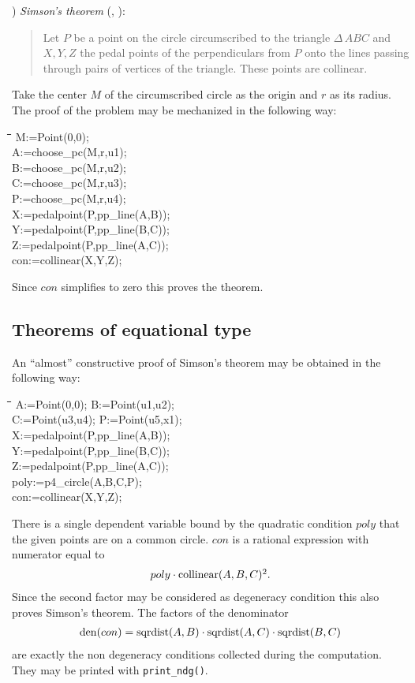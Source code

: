 \documentclass{article}
\newenvironment{code}{\tt \begin{tabbing}
\hspace*{1cm}\=\hspace*{1cm}\=\hspace*{1cm}\=
\hspace*{1cm}\=\hspace*{1cm}\=\kill
}{\end{tabbing}}
\newcommand{\formel}[1]{\[\begin{array}{l} #1\end{array}\]}
\begin{document}
) {\em Simson's theorem} (\cite[p. 261]{Chou:84},
\cite[thm. 2.51]{Coxeter:67}):
\begin{quote}
Let $P$ be a point on the circle circumscribed to the triangle
$\Delta\,ABC$ and $X,Y,Z$ the pedal points of the perpendiculars from
$P$ onto the lines passing through pairs of vertices of the triangle.
These points are collinear.
\end{quote}

Take the center $M$ of the circumscribed circle as the origin and $r$
as its radius. The proof of the problem may be mechanized in the
following way:
\begin{code}\>\+
        M:=Point(0,0);\\
        A:=choose\_pc(M,r,u1);\\
        B:=choose\_pc(M,r,u2);\\
        C:=choose\_pc(M,r,u3);\\
        P:=choose\_pc(M,r,u4);\\
        X:=pedalpoint(P,pp\_line(A,B));\\
        Y:=pedalpoint(P,pp\_line(B,C));\\
        Z:=pedalpoint(P,pp\_line(A,C));\\[8pt]
 
        con:=collinear(X,Y,Z);
\end{code}
Since $con$ simplifies to zero this proves the theorem.

 
\subsection{Theorems of equational type}

An ``almost'' constructive proof of Simson's theorem may be obtained
in the following way:
\begin{code}\>\+
	A:=Point(0,0); B:=Point(u1,u2);\\
	C:=Point(u3,u4); P:=Point(u5,x1);\\
        X:=pedalpoint(P,pp\_line(A,B));\\
        Y:=pedalpoint(P,pp\_line(B,C));\\
        Z:=pedalpoint(P,pp\_line(A,C));\\[6pt]

	poly:=p4\_circle(A,B,C,P);\\[6pt]
 
        con:=collinear(X,Y,Z);
\end{code}
There is a single dependent variable bound by the quadratic condition
$poly$ that the given points are on a common circle. $con$ is a
rational expression with numerator equal to
\formel{poly\cdot {\rm collinear}(A,B,C)^2. }
Since the second factor may be considered as degeneracy condition this
also proves Simson's theorem. The factors of the denominator
\formel{{\rm den}(con)={\rm sqrdist}(A,B)\cdot {\rm sqrdist}(A,C)\cdot
{\rm sqrdist}(B,C) }
are exactly the non degeneracy conditions collected during the
computation. They may be printed with {\tt print\_ndg()}.
\medskip
\end{document}
